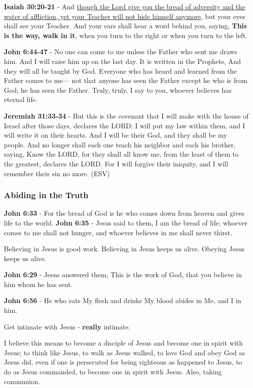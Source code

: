 \documentclass[11pt]{article}
\begin{document}
\textbf{Isaiah 30:20-21} - And \uline{though the Lord give you the bread of adversity and the water of affliction, yet your Teacher will not hide himself anymore}, but your eyes shall see your Teacher. And your ears shall hear a word behind you, saying, \textbf{This is the way, walk in it}, when you turn to the right or when you turn to the left.

\textbf{John 6:44-47} - No one can come to me unless the Father who sent me draws him. And I will raise him up on the last day. It is written in the Prophets, And they will all be taught by God. Everyone who has heard and learned from the Father comes to me— not that anyone has seen the Father except he who is from God; he has seen the Father. Truly, truly, I say to you, whoever believes has eternal life.

\textbf{Jeremiah 31:33-34} - But this is the covenant that I will make with the house of Israel after those days, declares the LORD: I will put my law within them, and I will write it on their hearts.  And I will be their God, and they shall be my people.  And no longer shall each one teach his neighbor and each his brother, saying, Know the LORD, for they shall all know me, from the least of them to the greatest, declares the LORD.  For I will forgive their iniquity, and I will remember their sin no more.  (ESV)

\subsubsection{Abiding in the Truth}
\label{sec:orge2f5b6b}
\textbf{John 6:33} - For the bread of God is he who comes down from heaven and gives life to the world.
\textbf{John 6:35} - Jesus said to them, I am the bread of life; whoever comes to me shall not hunger, and whoever believes in me shall never thirst.

Believing in Jesus is good work.
Believing in Jesus keeps us alive.
Obeying Jesus keeps us alive.

\textbf{John 6:29} - Jesus answered them, This is the work of God, that you believe in him whom he has sent.

\textbf{John 6:56} - He who eats My flesh and drinks My blood abides in Me, and I in him.

Get intimate with Jesus - \textbf{really} intimate.

I believe this means to become a disciple of Jesus and become one in spirit with Jesus; to think like Jesus, to walk as Jesus walked, to love God and obey God as Jesus did, even if one is persecuted for being righteous as happened to Jesus, to do as Jesus commanded, to become one in spirit with Jesus. Also, taking communion.
\end{document}
